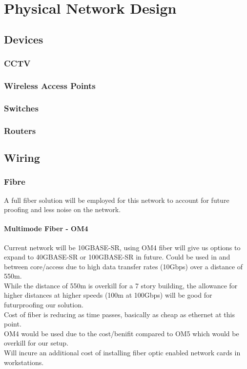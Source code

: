 \chapter{Physical Network Design}

\section{Devices}
\subsection{CCTV}
\subsection{Wireless Access Points}
\subsection{Switches}
\subsection{Routers}
\subsection{}
\section{Wiring}
\subsection{Fibre}
A full fiber solution will be employed for this network to account for future proofing and less noise on the network.
\subsubsection{Multimode Fiber - OM4}
Current network will be 10GBASE-SR, using OM4 fiber will give us options to expand to 40GBASE-SR or 100GBASE-SR in future.
Could be used in and between core/access due to high data transfer rates (10Gbps) over a distance of 550m.\\
While the distance of 550m is overkill for a 7 story building, the allowance for higher distances at higher speeds (100m at 100Gbps) will be good for futurproofing our solution.\\
Cost of fiber is reducing as time passes, basically as cheap as ethernet at this point.\\
OM4 would be used due to the cost/benifit compared to OM5 which would be overkill for our setup.\\
Will incure an additional cost of installing fiber optic enabled network cards in workstations.\\
